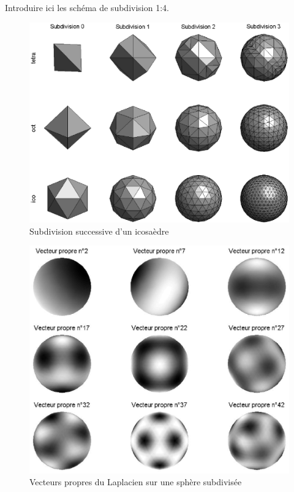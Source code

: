\mathspace{}
\begin{exo}
\label{exo-schemas-subdivision}

Introduire ici les schéma de subdivision 1:4.\begin{figure}[ht] 
    \begin{center}
    \includegraphics[scale=0.6]{images/graph-subdivision-sphere.eps}
    \end{center}
    \caption{Subdivision successive d'un icosaèdre}
	 \label{fig-graph-subdivision-sphere}
\end{figure}
\begin{figure}[ht] 
    \begin{center}
    \includegraphics[scale=0.6]{images/graph-subdivision-vecteurs-propres.ps}
    \end{center}
    \caption{Vecteurs propres du Laplacien sur une sphère subdivisée}
	 \label{fig-graph-subdivision-vecteurs-propres}
\end{figure}

\end{exo}\noindent

